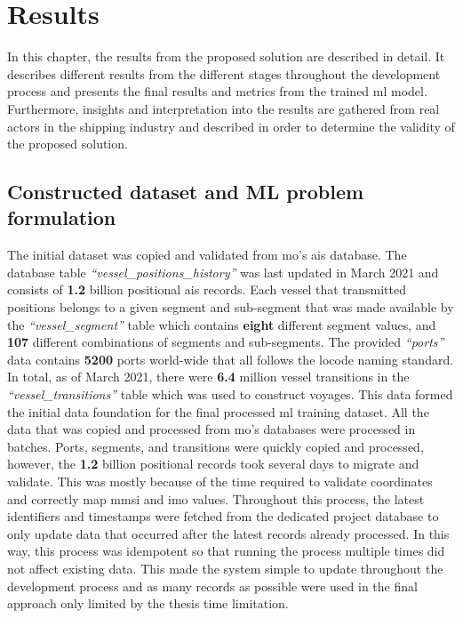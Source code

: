 \chapter{Results}
\label{chap:results}

In this chapter, the results from the proposed solution are described in detail. It describes different results from the different stages throughout the development process and presents the final results and metrics from the trained \acrfull{ml} model. Furthermore, insights and interpretation into the results are gathered from real actors in the shipping industry and described in order to determine the validity of the proposed solution.

\section{Constructed dataset and ML problem formulation}

The initial dataset was copied and validated from \acrfull{mo}'s \acrshort{ais} database. The database table \textit{``vessel\_positions\_history''} was last updated in March 2021 and consists of \textbf{1.2} billion positional \acrshort{ais} records. Each vessel that transmitted positions belongs to a given segment and sub-segment that was made available by the \textit{``vessel\_segment''} table which contains \textbf{eight} different segment values, and \textbf{107} different combinations of segments and sub-segments. The provided \textit{``ports''} data contains \textbf{5200} ports world-wide that all follows the \gls{locode} naming standard. In total, as of March 2021, there were \textbf{6.4} million vessel transitions in the \textit{``vessel\_transitions''} table which was used to construct voyages. This data formed the initial data foundation for the final processed \acrfull{ml} training dataset. All the data that was copied and processed from \acrshort{mo}'s databases were processed in batches. Ports, segments, and transitions were quickly copied and processed, however, the \textbf{1.2} billion positional records took several days to migrate and validate. This was mostly because of the time required to validate coordinates and correctly map \acrshort{mmsi} and \acrshort{imo} values. Throughout this process, the latest identifiers and timestamps were fetched from the dedicated project database to only update data that occurred after the latest records already processed. In this way, this process was idempotent so that running the process multiple times did not affect existing data. This made the system simple to update throughout the development process and as many records as possible were used in the final approach only limited by the thesis time limitation.

